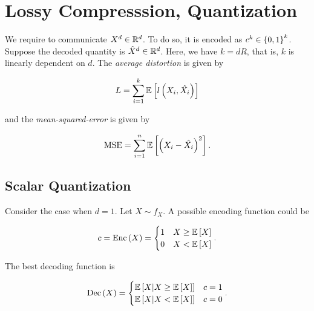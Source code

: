 \documentclass[twoside]{article}
\begin{document}



\section{Lossy Compresssion, Quantization}

We require to communicate \(X^d\in\mathbb R^d\). To do so, it is encoded as \(c^k\in\left\{0,1\right\}^k\). Suppose the decoded quantity is \(\hat{X}^d\in\mathbb R^d\). Here, we have \(k = dR\), that is, \(k\) is linearly dependent on \(d\). The \emph{average distortion} is given by

\begin{equation}
    L = \sum_{i=1}^k\mathbb{E}\left[ l\left(X_i,\hat{X_i}\right) \right]
    \label{eq:avg-dist}
\end{equation}

and the \emph{mean-squared-error} is given by

\begin{equation}
    \mathrm{MSE} = \sum_{i=1}^n\mathbb{E}\left[ \left(X_i-\hat{X_i}\right)^2 \right].
    \label{eq:mse-def}
\end{equation}

\subsection{Scalar Quantization}

Consider the case when \(d=1\). Let \(X\sim f_X\). A possible encoding function could be

\begin{equation}
    c = \mathrm{Enc}\left(X\right) =
    \begin{cases}
        1 & X \ge \mathbb{E}\left[ X \right] \\
        0 & X < \mathbb{E}\left[ X \right]
    \end{cases}.
    \label{eq:enc-possible}
\end{equation}

The best decoding function is

\begin{equation}
    \mathrm{Dec}\left(X\right) =
    \begin{cases}
        \mathbb{E}\left[ X|X\ge\mathbb{E}\left[ X \right] \right] & c = 1 \\
        \mathbb{E}\left[ X|X<\mathbb{E}\left[ X \right] \right] & c = 0
    \end{cases}.
    \label{eq:dec-possible}
\end{equation}
\end{document}

